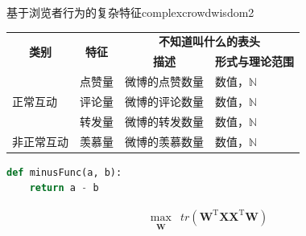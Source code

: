 \documentclass[a4paper,AutoFakeBold,oneside,12pt]{book}
\begin{document}
\begin{nopagenumber}
	\begin{bupttable}{基于浏览者行为的复杂特征}{complexcrowdwisdom2}
		\begin{tabular}{l|l|l|l}
			\hline
			\multicolumn{1}{c|}{\multirow{2}{*}{\textbf{类别}}} & \multicolumn{1}{c|}{\multirow{2}{*}{\textbf{特征}}} & \multicolumn{2}{c}{\textbf{不知道叫什么的表头}}                                               \\
			\cline{3-4}
			                                                    &                                                     & \multicolumn{1}{c|}{\textbf{描述}}              & \multicolumn{1}{c}{\textbf{形式与理论范围}} \\
			\hline
			\multirow{3}{*}{正常互动}                           & 点赞量                                              & 微博的点赞数量                                  & 数值，$\mathbb{N}$                          \\
			\cline{2-4}
			                                                    & 评论量                                              & 微博的评论数量                                  & 数值，$\mathbb{N}$                          \\
			\cline{2-4}
			                                                    & 转发量                                              & 微博的转发数量                                  & 数值，$\mathbb{N}$                          \\
			\hline
			非正常互动                                          & 羡慕量                                              & 微博的羡慕数量                                  & 数值，$\mathbb{N}$                          \\
			\hline
		\end{tabular}
	\end{bupttable}

	\begin{lstlisting}[language=Python, caption=减法, label=minus, tabsize=2]  
def minusFunc(a, b):
	return a - b 
\end{lstlisting}

	\begin{equation}
		\label{PCA_goal}
		\begin{aligned}
			\max_{\substack{\bm{W}}} & tr(\bm{W}^\mathrm{T}\bm{X}\bm{X}^ \mathrm{T}\bm{W})
		\end{aligned}
	\end{equation}


\end{nopagenumber}
\end{document}
